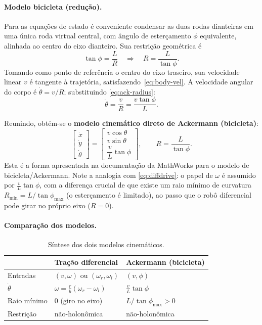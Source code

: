 \documentclass[11pt,a4paper]{article}
\begin{document}
\paragraph{Modelo bicicleta (redução).}
Para as equações de estado é conveniente condensar as duas rodas dianteiras
em uma única roda virtual central, com ângulo de esterçamento $\phi$
equivalente, alinhada ao centro do eixo dianteiro. Sua restrição geométrica
é
\begin{equation}
  \tan\phi = \frac{L}{R} \quad\Longrightarrow\quad R = \frac{L}{\tan\phi}.
  \label{eq:ack-radius}
\end{equation}
Tomando como ponto de referência o centro do eixo traseiro, sua velocidade
linear $v$ é tangente à trajetória, satisfazendo~\eqref{eq:body-vel}. A
velocidade angular do corpo é $\dot\theta = v/R$; substituindo
\eqref{eq:ack-radius}:
\begin{equation}
  \dot\theta = \frac{v}{R} = \frac{v\tan\phi}{L}.
  \label{eq:ack-w}
\end{equation}

Reunindo, obtém-se o \textbf{modelo cinemático direto de Ackermann
(bicicleta)}:
\begin{equation}
  \boxed{\;
  \begin{bmatrix}\dot{x}\\[2pt]\dot{y}\\[2pt]\dot{\theta}\end{bmatrix}
  =
  \begin{bmatrix}
    v\cos\theta\\[2pt]
    v\sin\theta\\[2pt]
    \dfrac{v}{L}\tan\phi
  \end{bmatrix},
  \qquad R = \frac{L}{\tan\phi}.
  \;}
  \label{eq:ackermann}
\end{equation}
Esta é a forma apresentada na documentação da MathWorks para o modelo de
bicicleta/Ackermann. Note a analogia com
\eqref{eq:diffdrive}: o papel de $\omega$ é assumido por $\tfrac{v}{L}\tan\phi$,
com a diferença crucial de que existe um raio mínimo de curvatura
$R_{\min}=L/\tan\phi_{\max}$ (o esterçamento é limitado), ao passo que o
robô diferencial pode girar no próprio eixo ($R=0$).

\paragraph{Comparação dos modelos.}
\begin{table}[H]
  \centering
  \begin{tabular}{lll}
    \toprule
    & \textbf{Tração diferencial} & \textbf{Ackermann (bicicleta)} \\
    \midrule
    Entradas & $(v,\omega)$ ou $(\omega_r,\omega_l)$ & $(v,\phi)$ \\
    $\dot\theta$ & $\omega = \frac{r}{b}(\omega_r-\omega_l)$ & $\frac{v}{L}\tan\phi$ \\
    Raio mínimo & $0$ (giro no eixo) & $L/\tan\phi_{\max} > 0$ \\
    Restrição & não-holonômica & não-holonômica \\
    \bottomrule
  \end{tabular}
  \caption{Síntese dos dois modelos cinemáticos.}
\end{table}
\end{document}
